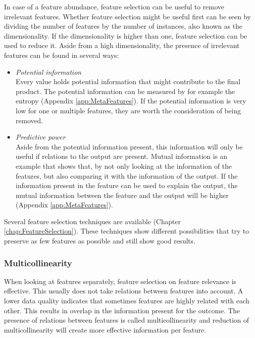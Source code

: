 \documentclass[10pt,a4paper]{report}
\begin{document}
	In case of a feature abundance, feature selection can be useful to remove irrelevant features. Whether feature selection might be useful first can be seen by dividing the number of features by the number of instances, also known as the dimensionality. If the dimensionality is higher than one, feature selection can be used to reduce it. Aside from a high dimensionality, the presence of irrelevant features can be found in several ways:
	
	\begin{itemize}
		\item \textit{Potential information} \\ 
		Every value holds potential information that might contribute to the final product. The potential information can be measured by for example the entropy \cite{agresti2003categorical} (Appendix \ref{app:MetaFeatures}). If the potential information is very low for one or multiple features, they are worth the consideration of being removed.
		\item \textit{Predictive power} \\ 
		Aside from the potential information present, this information will only be useful if relations to the output are present. Mutual information is an example that shows that, by not only looking at the information of the features, but also comparing it with the information of the output. If the information present in the feature can be used to explain the output, the mutual information between the feature and the output will be higher \cite{peng2005feature} (Appendix \ref{app:MetaFeatures}).
	\end{itemize}
	
	Several feature selection techniques are available (Chapter \ref{chap:FeatureSelection}). These techniques show different possibilities that try to preserve as few features as possible and still show good results.
	
	\subsubsection{Multicollinearity}
	
	When looking at features separately, feature selection on feature relevance is effective. This usually does not take relations between features into account. A lower data quality indicates that sometimes features are highly related with each other. This results in overlap in the information present for the outcome. The presence of relations between features is called multicollinearity and reduction of multicollinearity will create more effective information per feature.
	
\end{document}
